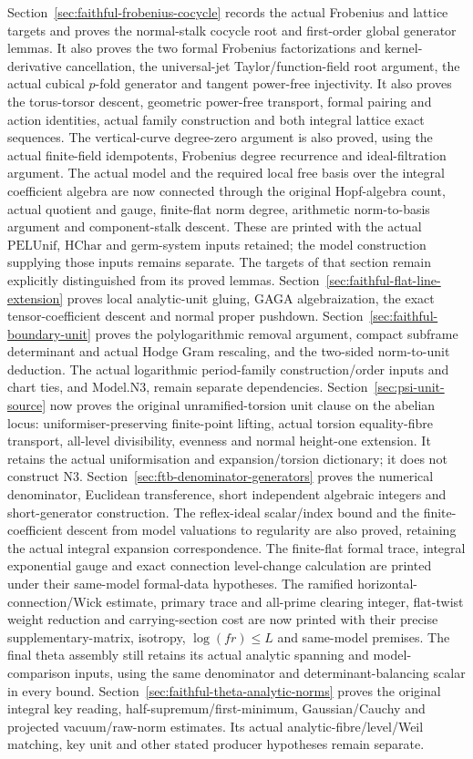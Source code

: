 Section~\ref{sec:faithful-frobenius-cocycle} records the actual
Frobenius and lattice targets and proves the normal-stalk cocycle
root and first-order global generator lemmas. It also proves the two
formal Frobenius factorizations and kernel-derivative cancellation,
the universal-jet Taylor/function-field root argument, the actual
cubical \(p\)-fold generator and tangent power-free injectivity.
It also proves the torus-torsor descent, geometric power-free transport,
formal pairing and action identities, actual family construction and
both integral lattice exact sequences. The vertical-curve degree-zero argument is also proved, using the
actual finite-field idempotents, Frobenius degree recurrence and
ideal-filtration argument. The actual model and the required
local free basis over the integral coefficient algebra are now connected
through the original Hopf-algebra count, actual quotient and gauge,
finite-flat norm degree, arithmetic norm-to-basis argument and
component-stalk descent. These are printed with the actual
\(\mathrm{PELUnif}\), \(\mathrm{HChar}\) and germ-system inputs retained;
the model construction supplying those inputs remains separate.
The targets of that section remain explicitly distinguished from
its proved lemmas. Section~\ref{sec:faithful-flat-line-extension}
proves local analytic-unit gluing, GAGA algebraization, the exact
tensor-coefficient descent and normal proper pushdown.
Section~\ref{sec:faithful-boundary-unit} proves the polylogarithmic
removal argument, compact subframe determinant and actual Hodge Gram
rescaling, and the two-sided norm-to-unit deduction. The actual
logarithmic period-family construction/order inputs and chart ties,
and \(\mathrm{Model.N3}\), remain separate dependencies.
Section~\ref{sec:psi-unit-source} now proves the original unramified-torsion
unit clause on the abelian locus: uniformiser-preserving finite-point
lifting, actual torsion equality-fibre transport, all-level divisibility,
evenness and normal height-one extension. It retains the actual
uniformisation and expansion/torsion dictionary; it does not construct N3. Section~\ref{sec:ftb-denominator-generators}
proves the numerical denominator, Euclidean transference,
short independent algebraic integers and short-generator construction.
The reflex-ideal scalar/index bound and the finite-coefficient descent
from model valuations to regularity are also proved, retaining the
actual integral expansion correspondence. The finite-flat formal trace,
integral exponential gauge and exact connection level-change calculation
are printed under their same-model formal-data hypotheses.
The ramified horizontal-connection/Wick estimate, primary trace and
all-prime clearing integer, flat-twist weight reduction and carrying-section
cost are now printed with their precise supplementary-matrix, isotropy,
\(\log(fr)\le L\) and same-model premises. The final theta assembly
still retains its actual analytic spanning and model-comparison inputs,
using the same denominator and determinant-balancing scalar in every bound.
Section~\ref{sec:faithful-theta-analytic-norms} proves the original integral
key reading, half-supremum/first-minimum, Gaussian/Cauchy and projected
vacuum/raw-norm estimates. Its actual analytic-fibre/level/Weil matching,
key unit and other stated producer hypotheses remain separate.

